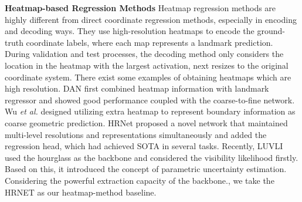 \documentclass[journal,transmag]{IEEEtran}
\begin{document}
{\bf Heatmap-based Regression Methods }
Heatmap regression methods are highly different from direct coordinate regression methods, especially in encoding and decoding ways.
They use high-resolution heatmaps to encode the ground-truth coordinate labels,  where each map represents a landmark prediction. 
During validation and test processes, the decoding method only considers the location in the heatmap with the largest activation, next resizes to the original coordinate system.
There exist some examples of obtaining heatmaps which are high resolution.
DAN \cite{kowalski2017deep} first combined heatmap information with landmark regressor and showed good performance coupled with the coarse-to-fine network.
Wu \emph{et al.} \cite{LABWFLW} designed utilizing extra heatmap to represent boundary information as coarse geometric prediction.
HRNet \cite{HRNET} proposed a novel network that maintained multi-level resolutions and representations simultaneously and added the regression head, which had achieved SOTA in several tasks.
Recently, LUVLI \cite{kumar2020luvli} used the hourglass\cite{yang2017stacked} as the backbone and considered the visibility likelihood firstly.
Based on this, it introduced the concept of parametric uncertainty estimation.
Considering the powerful extraction capacity of the backbone., we take the HRNET\cite{HRNET} as our heatmap-method baseline.
\end{document}
